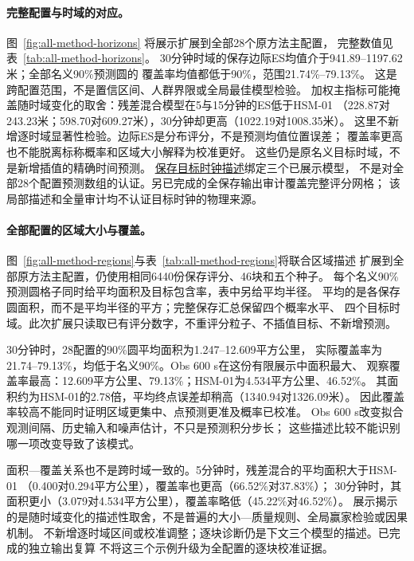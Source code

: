 \paragraph{完整配置与时域的对应。}
图~\ref{fig:all-method-horizons} 将展示扩展到全部28个原方法主配置，
完整数值见表~\ref{tab:all-method-horizons}。
30分钟时域的保存边际ES均值介于941.89--1197.62米；全部名义90\%预测圆的
覆盖率均值都低于90\%，范围21.74\%--79.13\%。
这是跨配置范围，不是置信区间、人群界限或全局最佳模型检验。
加权主指标可能掩盖随时域变化的取舍：残差混合模型在5与15分钟的ES低于HSM-01
（228.87对243.23米；598.70对609.27米），30分钟却更高（1022.19对1008.35米）。
这里不新增逐时域显著性检验。边际ES是分布评分，不是预测均值位置误差；
覆盖率更高也不能脱离标称概率和区域大小解释为校准更好。
这些仍是原名义目标时域，不是新增插值的精确时间预测。
\hyperref[sec:target-times]{保存目标时钟描述}绑定三个已展示模型，
不是对全部28个配置预测数组的认证。另已完成的全保存输出审计覆盖完整评分网格；
该局部描述和全量审计均不认证目标时钟的物理来源。


\FloatBarrier
\paragraph{全部配置的区域大小与覆盖。}
图~\ref{fig:all-method-regions}与表~\ref{tab:all-method-regions}将联合区域描述
扩展到全部原方法主配置，仍使用相同6440份保存评分、46块和五个种子。
每个名义90\%预测圆格子同时给平均面积及目标包含率，表中另给平均半径。
平均的是各保存圆面积，而不是平均半径的平方；完整保存汇总保留四个概率水平、
四个目标时域。此次扩展只读取已有评分数字，不重评分粒子、不插值目标、不新增预测。

30分钟时，28配置的90\%圆平均面积为1.247--12.609平方公里，
实际覆盖率为21.74--79.13\%，均低于名义90\%。Obs 600 s在这份有限展示中面积最大、
观察覆盖率最高：12.609平方公里、79.13\%；HSM-01为4.534平方公里、46.52\%。
其面积约为HSM-01的2.78倍，平均终点误差却稍高（1340.94对1326.09米）。
因此覆盖率较高不能同时证明区域更集中、点预测更准及概率已校准。
Obs 600 s改变拟合观测间隔、历史输入和噪声估计，不只是预测积分步长；
这些描述比较不能识别哪一项改变导致了该模式。

面积—覆盖关系也不是跨时域一致的。5分钟时，残差混合的平均面积大于HSM-01
（0.400对0.294平方公里），覆盖率也更高（66.52\%对37.83\%）；
30分钟时，其面积更小（3.079对4.534平方公里），覆盖率略低（45.22\%对46.52\%）。
展示揭示的是随时域变化的描述性取舍，不是普遍的大小—质量规则、全局赢家检验或因果机制。
不新增逐时域区间或校准调整；逐块诊断仍是下文三个模型的描述。已完成的独立输出复算
不将这三个示例升级为全配置的逐块校准证据。

\FloatBarrier

